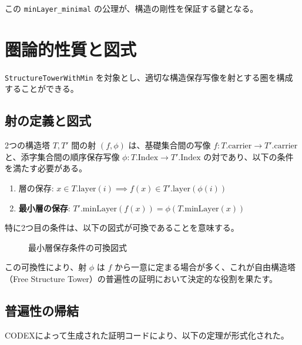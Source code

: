 \documentclass[11pt, a4paper]{article}
\begin{document}
この \texttt{minLayer\_minimal} の公理が、構造の剛性を保証する鍵となる。

\section{圏論的性質と図式}

\texttt{StructureTowerWithMin} を対象とし、適切な構造保存写像を射とする圏を構成することができる。

\subsection{射の定義と図式}

2つの構造塔 $T, T'$ 間の射 $(f, \phi)$ は、基礎集合間の写像 $f: T.\mathrm{carrier} \to T'.\mathrm{carrier}$ と、添字集合間の順序保存写像 $\phi: T.\mathrm{Index} \to T'.\mathrm{Index}$ の対であり、以下の条件を満たす必要がある。

\begin{enumerate}
    \item 層の保存: $x \in T.\mathrm{layer}(i) \implies f(x) \in T'.\mathrm{layer}(\phi(i))$
    \item \textbf{最小層の保存}: $T'.\mathrm{minLayer}(f(x)) = \phi(T.\mathrm{minLayer}(x))$
\end{enumerate}

特に2つ目の条件は、以下の図式が可換であることを意味する。

\begin{figure}[h]
    \centering
    \caption{最小層保存条件の可換図式}
    \label{fig:minlayer_comm}
\end{figure}

この可換性により、射 $\phi$ は $f$ から一意に定まる場合が多く、これが自由構造塔（Free Structure Tower）の普遍性の証明において決定的な役割を果たす。

\subsection{普遍性の帰結}

CODEXによって生成された証明コードにより、以下の定理が形式化された。
\end{document}
